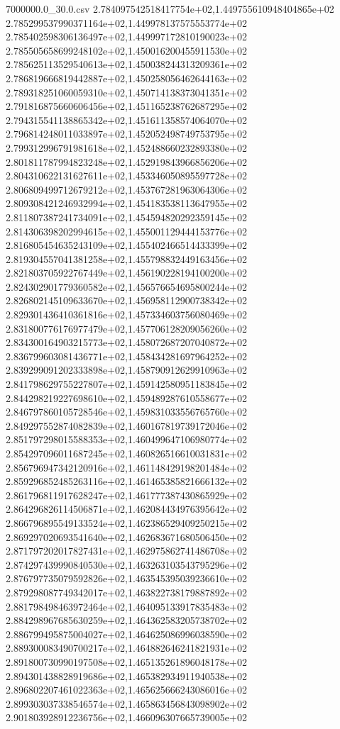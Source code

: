 \begin{filecontents*}{7000000.0_30.0.csv}
2.784097542518417754e+02,1.449755610948404865e+02
2.785299537990371164e+02,1.449978137575553774e+02
2.785402598306136497e+02,1.449997172810190023e+02
2.785505658699248102e+02,1.450016200455911530e+02
2.785625113529540613e+02,1.450038244313209361e+02
2.786819666819442887e+02,1.450258056462644163e+02
2.789318251060059310e+02,1.450714138373041351e+02
2.791816875660606456e+02,1.451165238762687295e+02
2.794315541138865342e+02,1.451611358574064070e+02
2.796814248011033897e+02,1.452052498749753795e+02
2.799312996791981618e+02,1.452488660232893380e+02
2.801811787994823248e+02,1.452919843966856206e+02
2.804310622131627611e+02,1.453346050895597728e+02
2.806809499712679212e+02,1.453767281963064306e+02
2.809308421246932994e+02,1.454183538113647955e+02
2.811807387241734091e+02,1.454594820292359145e+02
2.814306398202994615e+02,1.455001129444153776e+02
2.816805454635243109e+02,1.455402466514433399e+02
2.819304557041381258e+02,1.455798832449163456e+02
2.821803705922767449e+02,1.456190228194100200e+02
2.824302901779360582e+02,1.456576654695800244e+02
2.826802145109633670e+02,1.456958112900738342e+02
2.829301436410361816e+02,1.457334603756080469e+02
2.831800776176977479e+02,1.457706128209056260e+02
2.834300164903215773e+02,1.458072687207040872e+02
2.836799603081436771e+02,1.458434281697964252e+02
2.839299091202333898e+02,1.458790912629910963e+02
2.841798629755227807e+02,1.459142580951183845e+02
2.844298219227698610e+02,1.459489287610558677e+02
2.846797860105728546e+02,1.459831033556765760e+02
2.849297552874082839e+02,1.460167819739172046e+02
2.851797298015588353e+02,1.460499647106980774e+02
2.854297096011687245e+02,1.460826516610031831e+02
2.856796947342120916e+02,1.461148429198201484e+02
2.859296852485263116e+02,1.461465385821666132e+02
2.861796811917628247e+02,1.461777387430865929e+02
2.864296826114506871e+02,1.462084434976395642e+02
2.866796895549133524e+02,1.462386529409250215e+02
2.869297020693541640e+02,1.462683671680506450e+02
2.871797202017827431e+02,1.462975862741486708e+02
2.874297439990840530e+02,1.463263103543795296e+02
2.876797735079592826e+02,1.463545395039236610e+02
2.879298087749342017e+02,1.463822738179887892e+02
2.881798498463972464e+02,1.464095133917835483e+02
2.884298967685630259e+02,1.464362583205738702e+02
2.886799495875004027e+02,1.464625086996038590e+02
2.889300083490700217e+02,1.464882646241821931e+02
2.891800730990197508e+02,1.465135261896048178e+02
2.894301438828919686e+02,1.465382934911940538e+02
2.896802207461022363e+02,1.465625666243086016e+02
2.899303037338546574e+02,1.465863456843098902e+02
2.901803928912236756e+02,1.466096307665739005e+02

\end{filecontents*}
